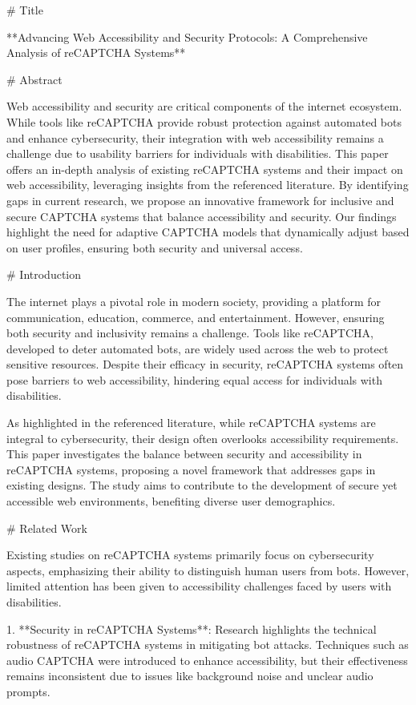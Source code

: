 # Title

**Advancing Web Accessibility and Security Protocols: A Comprehensive Analysis of reCAPTCHA Systems**

# Abstract

Web accessibility and security are critical components of the internet ecosystem. While tools like reCAPTCHA provide robust protection against automated bots and enhance cybersecurity, their integration with web accessibility remains a challenge due to usability barriers for individuals with disabilities. This paper offers an in-depth analysis of existing reCAPTCHA systems and their impact on web accessibility, leveraging insights from the referenced literature. By identifying gaps in current research, we propose an innovative framework for inclusive and secure CAPTCHA systems that balance accessibility and security. Our findings highlight the need for adaptive CAPTCHA models that dynamically adjust based on user profiles, ensuring both security and universal access.

# Introduction

The internet plays a pivotal role in modern society, providing a platform for communication, education, commerce, and entertainment. However, ensuring both security and inclusivity remains a challenge. Tools like reCAPTCHA, developed to deter automated bots, are widely used across the web to protect sensitive resources. Despite their efficacy in security, reCAPTCHA systems often pose barriers to web accessibility, hindering equal access for individuals with disabilities. 

As highlighted in the referenced literature, while reCAPTCHA systems are integral to cybersecurity, their design often overlooks accessibility requirements. This paper investigates the balance between security and accessibility in reCAPTCHA systems, proposing a novel framework that addresses gaps in existing designs. The study aims to contribute to the development of secure yet accessible web environments, benefiting diverse user demographics.

# Related Work

Existing studies on reCAPTCHA systems primarily focus on cybersecurity aspects, emphasizing their ability to distinguish human users from bots. However, limited attention has been given to accessibility challenges faced by users with disabilities. 

1. **Security in reCAPTCHA Systems**: Research highlights the technical robustness of reCAPTCHA systems in mitigating bot attacks. Techniques such as audio CAPTCHA were introduced to enhance accessibility, but their effectiveness remains inconsistent due to issues like background noise and unclear audio prompts.


